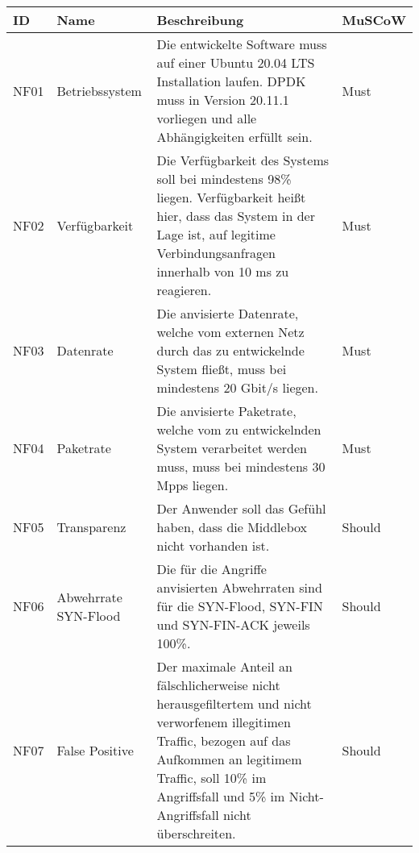 \documentclass[../review_1.tex]{subfiles}
\begin{document}
\begin{longtable}[ht] { p{1cm} p{4cm} p{7cm} l }
    \textbf{ID} & \textbf{Name}        & \textbf{Beschreibung}                                                                                                                                                                                                                    & \textbf{MuSCoW} \\ \toprule \endhead
    NF01        & Betriebssystem       & Die entwickelte Software muss auf einer Ubuntu 20.04 LTS Installation laufen. DPDK muss in Version 20.11.1 vorliegen und alle Abhängigkeiten erfüllt sein.                                                                               & Must            \\
    NF02        & Verfügbarkeit        & Die Verfügbarkeit des Systems soll bei mindestens 98\% liegen. Verfügbarkeit heißt hier, dass das System in der Lage ist, auf legitime Verbindungsanfragen innerhalb von 10 ms zu reagieren.                                             & Must            \\
    NF03        & Datenrate            & Die anvisierte Datenrate, welche vom externen Netz durch das zu entwickelnde System fließt, muss bei mindestens 20 Gbit/s liegen.                                                                                                        & Must            \\
    NF04        & Paketrate            & Die anvisierte Paketrate, welche vom zu entwickelnden System verarbeitet werden muss, muss bei mindestens 30 Mpps liegen.                                                                                                                & Must            \\
    NF05        & Transparenz          & Der Anwender soll das Gefühl haben, dass die Middlebox nicht vorhanden ist.                                                                                                                                                              & Should          \\
    NF06        & Abwehrrate SYN-Flood & Die für die Angriffe anvisierten Abwehrraten sind für die SYN-Flood, SYN-FIN und SYN-FIN-ACK jeweils 100\%.                                                                                                                              & Should          \\
    NF07        & False Positive       & Der maximale Anteil an fälschlicherweise nicht herausgefiltertem und nicht verworfenem illegitimen Traffic, bezogen auf das Aufkommen an legitimem Traffic, soll 10\% im Angriffsfall und 5\% im Nicht-Angriffsfall nicht überschreiten. & Should          \\

\end{longtable}
\end{document}

